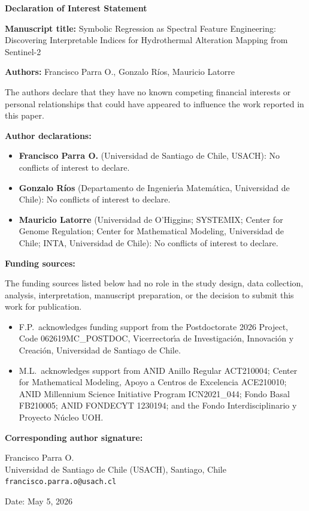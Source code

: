 \documentclass[11pt,a4paper]{article}
\begin{document}
\begin{center}
{\Large\bfseries Declaration of Interest Statement}

\vspace{0.5em}

\textbf{Manuscript title:} Symbolic Regression as Spectral Feature Engineering: Discovering Interpretable Indices for Hydrothermal Alteration Mapping from Sentinel-2

\textbf{Authors:} Francisco Parra O., Gonzalo R\'ios, Mauricio Latorre
\end{center}

\vspace{1em}

The authors declare that they have no known competing financial interests or personal relationships that could have appeared to influence the work reported in this paper.

\vspace{2em}

\noindent\textbf{Author declarations:}

\begin{itemize}
\item \textbf{Francisco Parra O.} (Universidad de Santiago de Chile, USACH): No conflicts of interest to declare.
\item \textbf{Gonzalo R\'ios} (Departamento de Ingenier\'\i a Matem\'atica, Universidad de Chile): No conflicts of interest to declare.
\item \textbf{Mauricio Latorre} (Universidad de O'Higgins; SYSTEMIX; Center for Genome Regulation; Center for Mathematical Modeling, Universidad de Chile; INTA, Universidad de Chile): No conflicts of interest to declare.
\end{itemize}

\vspace{2em}

\noindent\textbf{Funding sources:}

The funding sources listed below had no role in the study design, data collection, analysis, interpretation, manuscript preparation, or the decision to submit this work for publication.

\begin{itemize}
\item F.P.\ acknowledges funding support from the Postdoctorate 2026 Project, Code 062619MC\_POSTDOC, Vicerrector\'\i a de Investigaci\'on, Innovaci\'on y Creaci\'on, Universidad de Santiago de Chile.
\item M.L.\ acknowledges support from ANID Anillo Regular ACT210004; Center for Mathematical Modeling, Apoyo a Centros de Excelencia ACE210010; ANID Millennium Science Initiative Program ICN2021\_044; Fondo Basal FB210005; ANID FONDECYT 1230194; and the Fondo Interdisciplinario y Proyecto N\'ucleo UOH.
\end{itemize}

\vspace{3em}

\noindent\textbf{Corresponding author signature:}

\vspace{1em}
\noindent Francisco Parra O.\\
Universidad de Santiago de Chile (USACH), Santiago, Chile\\
\texttt{francisco.parra.o@usach.cl}

\vspace{1em}

\noindent Date: May 5, 2026
\end{document}
